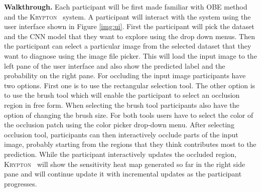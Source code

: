 \documentclass{vldb}
\newcommand{\system}{\textsc{Krypton}}
\begin{document}
\textbf{Walkthrough.} Each participant will be first made familiar with OBE method and the \system~ system.
A participant will interact with the system using the user interface shown in Figure \ref{img:ui}.
First the participant will pick the dataset and the CNN model that they want to explore using the drop down menus.
Then the participant can select a particular image from the selected dataset that they want to diagnose using the image file picker. This will load the input image to the left pane of the user interface and also show the predicted label and the probability on the right pane.
For occluding the input image participants have two options. First one is to use the rectangular selection tool. The other option is to use the brush tool which will enable the participant to select an occlusion region in free form.
When selecting the brush tool participants also have the option of changing the brush size. For both tools users have to select the color of the occlusion patch using the color picker drop-down menu.
After selecting occlusion tool, participants can then interactively occlude parts of the input image, probably starting from the regions that they think contributes most to the prediction.
While the participant interactively updates the occluded region, \system~ will show the sensitivity heat map generated so far in the right side pane and will continue update it with incremental updates as the participant progresses.

\balance



\end{document}
